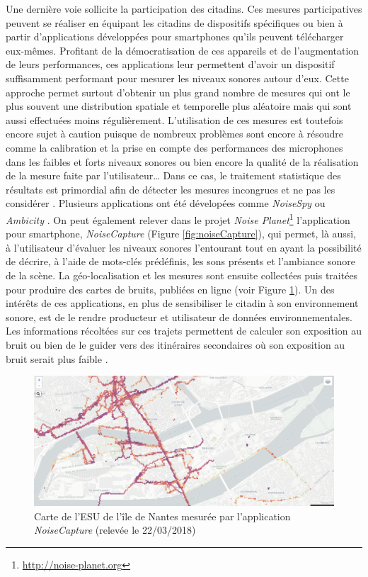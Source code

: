 Une dernière voie sollicite la participation des citadins. Ces mesures participatives peuvent se réaliser en équipant les citadins de dispositifs spécifiques \cite{delaitre2014influence} ou bien à partir d'applications développées pour smartphones qu'ils peuvent télécharger eux-mêmes. Profitant de la démocratisation de ces appareils et de l'augmentation de leurs performances, ces applications leur permettent d'avoir un dispositif suffisamment performant pour mesurer les niveaux sonores autour d'eux. Cette approche permet surtout d'obtenir un plus grand nombre de mesures qui ont le plus souvent une distribution spatiale et temporelle plus aléatoire mais qui sont aussi effectuées moins régulièrement. L'utilisation de ces mesures est toutefois encore sujet à caution puisque de nombreux problèmes sont encore à résoudre comme la calibration et la prise en compte des performances des microphones dans les faibles et forts niveaux sonores \cite{aumond2017study} ou bien encore la qualité de la réalisation de la mesure faite par l'utilisateur\dots{} Dans ce cas, le traitement statistique des résultats est primordial afin de détecter les mesures incongrues et ne pas les considérer \cite{guillaume2016noise}. Plusieurs applications ont été dévelopées comme \textit{NoiseSpy} \cite{kanjo_noisespy_2010} ou \textit{Ambicity} \cite{ventura2017estimation}. On peut également relever dans le projet \textit{Noise Planet}\footnote{\url{http://noise-planet.org}} l'application pour smartphone, \textit{NoiseCapture} \cite{guillaume2016noise} (Figure \ref{fig:noiseCapture}), qui permet, là aussi, à l'utilisateur d'évaluer les niveaux sonores l'entourant tout en ayant la possibilité de décrire, à l'aide de mots-clés prédéfinis, les sons présents et l'ambiance sonore de la scène. La géo-localisation et les mesures sont ensuite collectées puis traitées pour produire des cartes de bruits, publiées en ligne (voir Figure \ref{fig:carte_noiseModelling}). Un des intérêts de ces applications, en plus de sensibiliser le citadin à son environnement sonore, est de le rendre producteur et utilisateur de données environnementales. Les informations récoltées sur ces trajets permettent de calculer son exposition au bruit ou bien de le guider vers des itinéraires secondaires où son exposition au bruit serait plus faible \cite{aumond2016sound}.\\

\begin{figure}[t]
\centering
\includegraphics[width=0.7\linewidth]{./figures/cartographie/noise_modelling.PNG}
\caption{Carte de l'ESU de l'île de Nantes mesurée par l'application \textit{NoiseCapture}  (relevée le 22/03/2018)}
\label{fig:carte_noiseModelling}
\end{figure}


